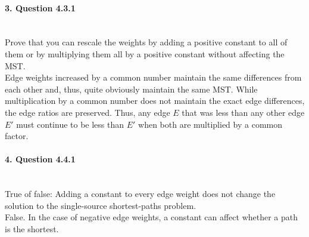 \documentclass{article}
\begin{document}
\paragraph{\Large 3. Question 4.3.1}\mbox{}\\
Prove that you can rescale the weights by adding a positive constant to all of them or by multiplying them all by a positive constant without affecting the MST.\\

Edge weights increased by a common number maintain the same differences from each other and, thus, quite obviously maintain the same MST. While multiplication by a common number does not maintain the exact edge differences, the edge ratios are preserved. Thus, any edge $E$ that was less than any other edge $E'$ must continue to be less than $E'$ when both are multiplied by a common factor.

\paragraph{\Large 4. Question 4.4.1}\mbox{}\\
True of false: Adding a constant to every edge weight does not change the solution to the single-source shortest-paths problem.\\

False. In the case of negative edge weights, a constant can affect whether a path is the shortest.
\end{document}

